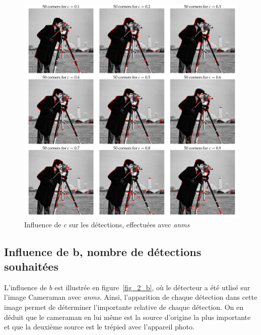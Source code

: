 \documentclass[12pt,a4paper,onecolumn]{article}
\begin{document}
\begin{figure}[H]
	\centering
	\includegraphics[width = 1.0\textwidth]{2_cameraman_c}
	\caption{Influence de \(c\) sur les détections, effectuées avec \textit{anms}}
	\label{fig_2_c}
\end{figure}

\subsection{Influence de b, nombre de détections souhaitées}

L'influence de \(b\) est illustrée en figure~\ref{fig_2_b}, où le détecteur a été utlisé sur l'image Cameraman avec \textit{anms}.  Ainsi, l'apparition de chaque détection dans cette image permet de déterminer l'importante relative de chaque détection. On en déduit que le cameraman en lui même est la source d'origine la plus importante et que la deuxième source est le trépied avec l'appareil photo.
\end{document}
